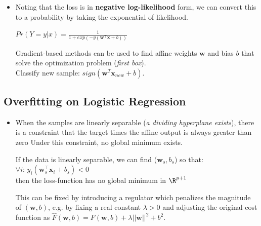 \documentclass[english]{latex4ei/latex4ei_sheet}
\begin{document}
\begin{sectionbox}
\begin{itemize}
\begin{center}
\begin{emphbox}
    \end{emphbox}
\end{center}
\item Noting that the loss is in \textbf{negative log-likelihood} form, we can convert this to a probability by taking the exponential of likelihood.
\begin{emphbox}
    \begin{center}
        $Pr(Y=y|x)=\frac{1}{1+exp(-y(\boldsymbol{w}^{\top}\boldsymbol{x}+b))}$
    \end{center}
\end{emphbox}
Gradient-based methods can be used to find affine weights $\boldsymbol{w}$ and bias $b$ that solve the optimization problem (\emph{first box}).\\ Classify new sample: $sign(\boldsymbol{w}^{T}\boldsymbol{x}_{new}+b)$.
\end{itemize}

\subsection{Overfitting on Logistic Regression}
\begin{itemize}
\item When the samples are linearly separable (\emph{a dividing hyperplane exists}), there is a constraint that the target times the affine output is always greater than zero Under this constraint, no global minimum exists.
\begin{emphbox}
    If the data is linearly separable, we can find ($\boldsymbol{w}_s,b_s$) so that: $\forall i:\,y_i(\boldsymbol{w}_s^{\top}\boldsymbol{x}_i+b_s)<0$ \\
    then the loss-function has no global minimum in $\R^{p+1}$
\end{emphbox}
This can be fixed by introducing a regulator which penalizes the magnitude of $(\boldsymbol{w}, b)$, e.g. by fixing a real constant $\lambda>0$ and adjusting the original cost function as  $\hat{F}(\boldsymbol{w}, b)=F(\boldsymbol{w}, b)+\lambda||\boldsymbol{w}||^2+b^2$.
\end{itemize}


\end{sectionbox}
\end{document}
